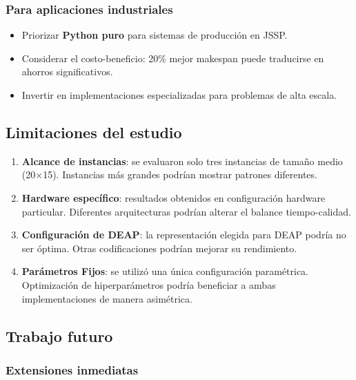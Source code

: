 \documentclass[12pt,a4paper]{article}
\begin{document}
\subsubsection{Para aplicaciones industriales}

\begin{itemize}
    \item Priorizar \textbf{Python puro} para sistemas de producción en JSSP.
    \item Considerar el costo-beneficio: 20\% mejor makespan puede traducirse en ahorros significativos.
    \item Invertir en implementaciones especializadas para problemas de alta escala.
\end{itemize}

\subsection{Limitaciones del estudio}

\begin{enumerate}
    \item \textbf{Alcance de instancias}: se evaluaron solo tres instancias de tamaño medio (20×15). Instancias más grandes podrían mostrar patrones diferentes.
    
    \item \textbf{Hardware específico}: resultados obtenidos en configuración hardware particular. Diferentes arquitecturas podrían alterar el balance tiempo-calidad.
    
    \item \textbf{Configuración de DEAP}: la representación elegida para DEAP podría no ser óptima. Otras codificaciones podrían mejorar su rendimiento.
    
    \item \textbf{Parámetros Fijos}: se utilizó una única configuración paramétrica. Optimización de hiperparámetros podría beneficiar a ambas implementaciones de manera asimétrica.
\end{enumerate}

\subsection{Trabajo futuro}

\subsubsection{Extensiones inmediatas}
\end{document}
